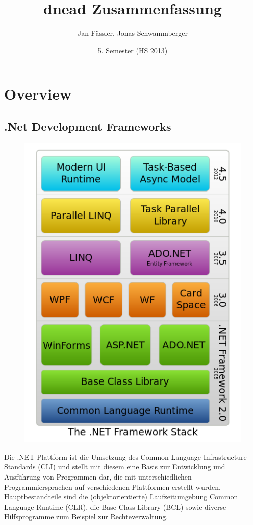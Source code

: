 \documentclass[10pt]{article}
\title{
	\vspace{5cm}
	dnead Zusammenfassung
}
\author{Jan Fässler, Jonas Schwammberger}
\date{5. Semester (HS 2013)}
\begin{document}
\maketitle
\thispagestyle{fancy}

\newpage

\tableofcontents	  	


\newpage
\setcounter{page}{1}


\section{Overview}
\subsection{.Net Development Frameworks}
\begin{figure}
\includegraphics[scale=0.4]{DotNet.png}
\end{figure}
Die .NET-Plattform ist die Umsetzung des Common-Language-Infrastructure-Standards (CLI) und stellt mit diesem eine Basis zur Entwicklung und Ausführung von Programmen dar, die mit unterschiedlichen Programmiersprachen auf verschiedenen Plattformen erstellt wurden. Hauptbestandteile sind die (objektorientierte) Laufzeitumgebung Common Language Runtime (CLR), die Base Class Library (BCL) sowie diverse Hilfsprogramme zum Beispiel zur Rechteverwaltung. 
\end{document}
